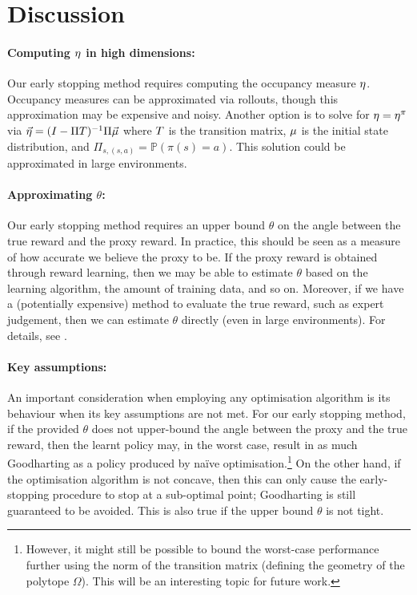 
\section{Discussion}

\paragraph{Computing $\eta$ in high dimensions:} 
Our early stopping method requires computing the occupancy measure $\eta$. Occupancy measures can be approximated via rollouts, though this approximation may be expensive and noisy.
Another option is to solve for $\eta = \mathbf{\eta^{\pi}}$ via  $\vec{\eta} = (I-\Pi T)^{-1}\Pi \vec{\mu}$ where $T$ is the transition matrix, $\mu$ is the initial state distribution, and $\Pi_{s, (s, a)} = \mathbb{P}(\pi(s) = a)$. This solution could be approximated in large environments. 

\paragraph{Approximating $\theta$:} Our early stopping method requires an upper bound $\theta$ on the angle between the true reward and the proxy reward. In practice, this should be seen as a measure of how accurate we believe the proxy to be. If the proxy reward is obtained through reward learning, then we may be able to estimate $\theta$ based on the learning algorithm, the amount of training data, and so on. 
Moreover, if we have a (potentially expensive) method to evaluate the true reward, such as expert judgement, then we can estimate $\theta$ directly (even in large environments). For details, see \citet{skalse2023starc}.

\paragraph{Key assumptions:} An important consideration when employing any optimisation algorithm is its behaviour when its key assumptions are not met. 
For our early stopping method, if the provided $\theta$ does not upper-bound the angle between the proxy and the true reward, then the learnt policy may, in the worst case, result in as much Goodharting as a policy produced by na\"ive optimisation.\footnote{However, it might still be possible to bound the worst-case performance further using the norm of the transition matrix (defining the geometry of the polytope $\Omega$). This will be an interesting topic for future work.} On the other hand, if the optimisation algorithm is not concave, then this can only cause the early-stopping procedure to stop at a sub-optimal point; Goodharting is still guaranteed to be avoided. This is also true if the upper bound $\theta$ is not tight.

